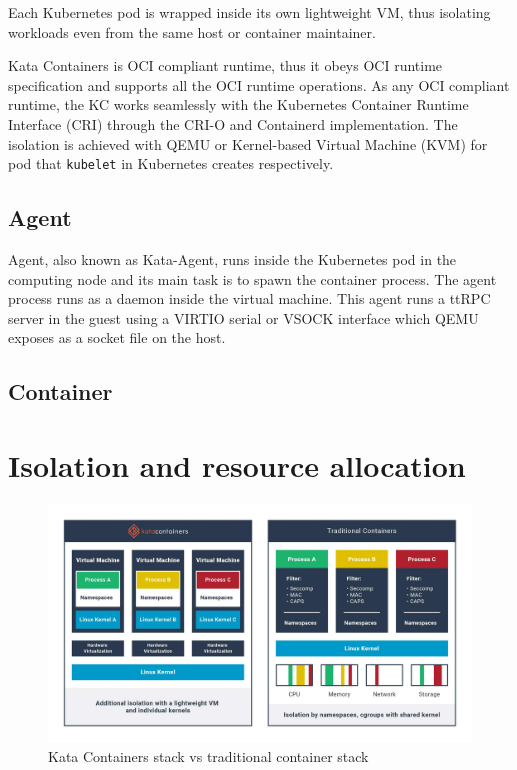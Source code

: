 Each Kubernetes pod is wrapped inside its own lightweight VM, thus isolating workloads even from the same host or container maintainer.




Kata Containers is OCI compliant runtime, thus it obeys OCI runtime specification and supports all the OCI runtime operations. As any OCI compliant runtime, the KC works seamlessly with the Kubernetes Container Runtime Interface (CRI) through the CRI-O and Containerd implementation. The isolation is achieved with QEMU \cite{QEMU} or Kernel-based Virtual Machine (KVM) \cite{KVM} for pod that \texttt{kubelet} in Kubernetes creates respectively.


\subsection{Agent}

Agent, also known as Kata-Agent, runs inside the Kubernetes pod in the computing node and its main task is to spawn the container process. The agent process runs as a daemon inside the virtual machine. This agent runs a ttRPC server in the guest using a VIRTIO serial or VSOCK interface which QEMU exposes as a socket file on the host. \cite{KataContainersArchitecture}


\subsection{Container}




\section{Isolation and resource allocation}

\begin{figure}[ht]
  \begin{center}
    \includegraphics[width=14cm]{LaTeX/images/KataContainersStack.jpg}
    \caption{Kata Containers stack vs traditional container stack\cite{KataContainers}}
    \label{fig:KataContainersStack}
  \end{center}
\end{figure} 

